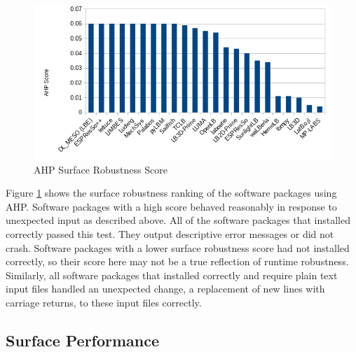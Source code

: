 \documentclass[12pt, notitlepage]{article}
\begin{document}
\begin{figure}[h!]
	\begin{center}
		\includegraphics[width=1.0\textwidth]{robustness_chart}
		\caption{AHP Surface Robustness Score}
		\label{Fig_Robustness}
	\end{center}
\end{figure}

Figure \ref{Fig_Robustness} shows the surface robustness ranking of the software packages using AHP. Software packages with a high score behaved reasonably in response to unexpected input as described above. All of the software packages that installed correctly passed this test. They output descriptive error messages or did not crash. Software packages with a lower surface robustness score had not installed correctly, so their score here may not be a true reflection of runtime robustness. Similarly, all software packages that installed correctly and require plain text input files handled an unexpected change, a replacement of new lines with carriage returns, to these input files correctly. 

\subsection{Surface Performance}
\end{document}
